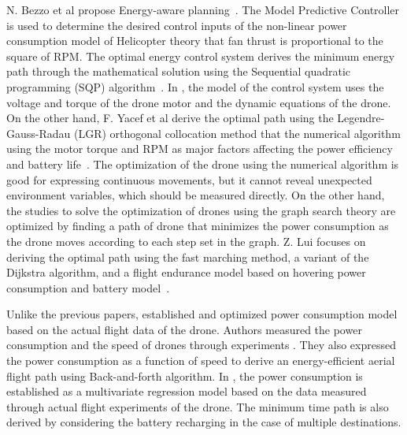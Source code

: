 \documentclass[journal]{./template/IEEEtran}
\begin{document}
N. Bezzo et al propose Energy-aware planning~\cite{ref_5}. The Model Predictive Controller is used to determine the desired control inputs of the non-linear power consumption model of Helicopter theory that fan thrust is proportional to the square of RPM.
The optimal energy control system derives the minimum energy path through the mathematical solution using the Sequential quadratic programming (SQP) algorithm~\cite{ref_6}. 
In \cite{ref_6}, the model of the control system uses the voltage and torque of the drone motor and the dynamic equations of the drone. 
On the other hand, F. Yacef et al derive the optimal path using the Legendre-Gauss-Radau (LGR) orthogonal collocation method that the numerical algorithm using the motor torque and RPM as major factors affecting the power efficiency and battery life~\cite{ref_7}. 
The optimization of the drone using the numerical algorithm is good for expressing continuous movements, but it cannot reveal unexpected environment variables, which should be measured directly.
On the other hand, the studies to solve the optimization of drones using the graph search theory are optimized by finding a path of drone that minimizes the power consumption as the drone moves according to each step set in the graph. 
Z. Lui focuses on deriving the optimal path using the fast marching method, a variant of the Dijkstra algorithm, and a flight endurance model based on hovering power consumption and battery model~\cite{ref_10}.

Unlike the previous papers, \cite{ref_8,ref_9} established and optimized power consumption model based on the actual flight data of the drone.
Authors measured the power consumption and the speed of drones through experiments \cite{ref_8}. They also expressed the power consumption as a function of speed to derive an energy-efficient aerial flight path using Back-and-forth algorithm.
In \cite{ref_9}, the power consumption is established as a multivariate regression model based on the data measured through actual flight experiments of the drone.
The minimum time path is also derived by considering the battery recharging in the case of multiple destinations.
\end{document}
